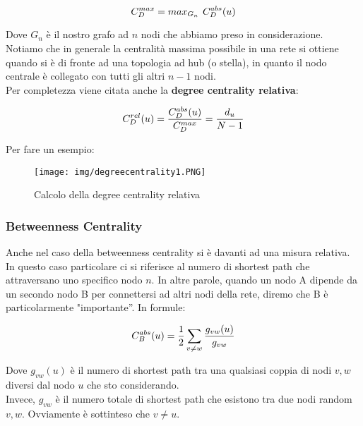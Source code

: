 \documentclass[12pt,twoside]{report}
\begin{document}
    \begin{equation}
    \large
        \displaystyle C_D^{max}= max_{G_n} \ C_D^{abs}(u)
    \end{equation}\vspace{0.8em}
    
    Dove $G_n$ è il nostro grafo ad $n$ nodi che abbiamo preso in considerazione. Notiamo che in generale la centralità massima possibile in una rete si ottiene quando si è di fronte ad una topologia ad hub (o stella), in quanto il nodo centrale è collegato con tutti gli altri $n-1$ nodi.\\
    
    Per completezza viene citata anche la \textbf{degree centrality relativa}:
    
    \begin{equation}
    \large
        \displaystyle C_D^{rel} (u)= \frac{C_D^{abs}(u)}{C_D^{max}} = \frac{d_u}{N-1}
    \end{equation}\vspace{0.8em}
    
    Per fare un esempio: 
    
    \begin{figure}[htb]
    	\hfill\texttt{[image: img/degreecentrality1.PNG]}\hfill
    	\label{fig:Adj1}
    	\caption{Calcolo della degree centrality relativa}
    \end{figure}
    
    \FloatBarrier
    
    
    \subsubsection{Betweenness Centrality}
    
    Anche nel caso della betweenness centrality si è davanti ad una misura relativa. In questo caso particolare ci si riferisce  al numero di shortest path che attraversano uno specifico nodo $n$.
    In altre parole, quando un nodo A dipende da un secondo nodo B per connettersi ad altri nodi della rete, diremo che B è particolarmente "importante''. In formule:
    
    \begin{equation}
    \large
        \displaystyle C_B^{abs} (u)= \frac{1}{2} \sum_{v \neq w}  \frac{g_{vw}(u)}{g_{vw}}
    \end{equation}
    
    Dove $g_{vw}(u)$ è il numero di shortest path tra una qualsiasi coppia di nodi $v,w$ diversi dal nodo $u$ che sto considerando.\\
    Invece, $g_{vw}$ è il numero totale di shortest path che esistono tra due nodi random $v,w$. Ovviamente è sottinteso che $v \neq u$.\\
    
\end{document}
